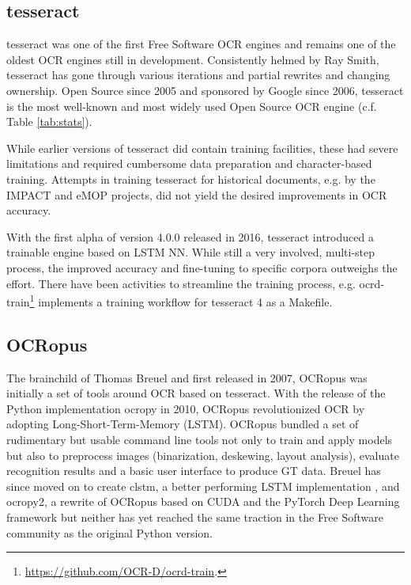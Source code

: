 \documentclass[conference]{IEEEtran}
\begin{document}
\subsection{tesseract}

tesseract \cite{4376991} was one of the first Free Software OCR
engines \cite{Rice1995TheFA} and remains one of the oldest OCR engines still in
development. Consistently helmed by Ray Smith, tesseract has gone
through various iterations and partial rewrites and changing
ownership. Open Source since 2005 and sponsored by Google since
2006, tesseract is the most well-known and most widely used Open
Source OCR engine (c.f. Table \ref{tab:stats}).

While earlier versions of tesseract did contain training facilities, 
these had severe limitations and required cumbersome data preparation and
character-based training. Attempts in training tesseract for historical documents, e.g.
by the IMPACT \cite{PSNC} and eMOP \cite{doi:10.1093/llc/fqv062} projects, did not yield 
the desired improvements in OCR accuracy.

With the first alpha of version 4.0.0 released in 2016, tesseract introduced a trainable
engine based on LSTM NN.\cite{smith2016tesseract} While still a very involved, multi-step process, the
improved accuracy and fine-tuning to specific corpora outweighs the effort.
There have been activities to streamline the training process, e.g.
ocrd-train\footnote{\url{https://github.com/OCR-D/ocrd-train}.} implements a training workflow for
tesseract 4 as a Makefile.

\subsection{OCRopus}

The brainchild of Thomas Breuel and first released in 2007, OCRopus
\cite{breuel} was initially a set of tools around OCR based on
tesseract. With the release of the Python implementation ocropy in
2010, OCRopus revolutionized OCR by adopting
Long-Short-Term-Memory (LSTM). OCRopus bundled a set of rudimentary but
usable command line tools not only to train and apply models but
also to preprocess images (binarization, deskewing, layout analysis),
evaluate recognition results and a basic user interface to produce
GT data. Breuel has since moved on to create clstm, a better
performing LSTM implementation \cite{DBLP:conf/icdar/Breuel17}, and
ocropy2, a rewrite of OCRopus based on CUDA and the PyTorch Deep
Learning framework \cite{DBLP:conf/icdar/Breuel17} but neither has
yet reached the same traction in the Free Software community as the
original Python version.
\end{document}
